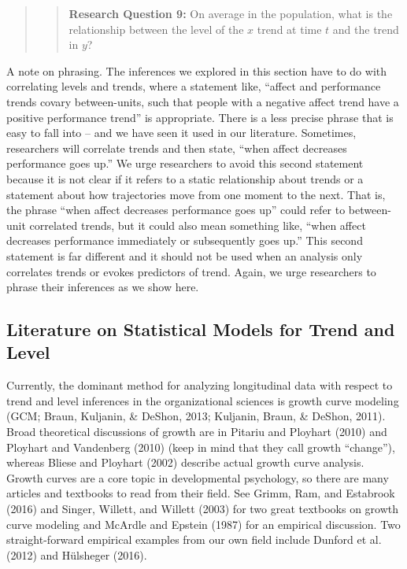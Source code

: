 \documentclass[english,,man]{apa6}
\theoremstyle{definition}
\theoremstyle{definition}
\theoremstyle{definition}
\theoremstyle{remark}
\begin{document}
\begin{quote}
\begin{quote}
\textbf{Research Question 9:} On average in the population, what is the
relationship between the level of the \(x\) trend at time \(t\) and the
trend in \(y\)?
\end{quote}
\end{quote}

A note on phrasing. The inferences we explored in this section have to
do with correlating levels and trends, where a statement like,
\enquote{affect and performance trends covary between-units, such that
people with a negative affect trend have a positive performance trend}
is appropriate. There is a less precise phrase that is easy to fall into
-- and we have seen it used in our literature. Sometimes, researchers
will correlate trends and then state, \enquote{when affect decreases
performance goes up.} We urge researchers to avoid this second statement
because it is not clear if it refers to a static relationship about
trends or a statement about how trajectories move from one moment to the
next. That is, the phrase \enquote{when affect decreases performance
goes up} could refer to between-unit correlated trends, but it could
also mean something like, \enquote{when affect decreases performance
immediately or subsequently goes up.} This second statement is far
different and it should not be used when an analysis only correlates
trends or evokes predictors of trend. Again, we urge researchers to
phrase their inferences as we show here.

\hypertarget{literature-on-statistical-models-for-trend-and-level}{%
\subsection{Literature on Statistical Models for Trend and
Level}\label{literature-on-statistical-models-for-trend-and-level}}

Currently, the dominant method for analyzing longitudinal data with
respect to trend and level inferences in the organizational sciences is
growth curve modeling (GCM; Braun, Kuljanin, \& DeShon, 2013; Kuljanin,
Braun, \& DeShon, 2011). Broad theoretical discussions of growth are in
Pitariu and Ployhart (2010) and Ployhart and Vandenberg (2010) (keep in
mind that they call growth \enquote{change}), whereas Bliese and
Ployhart (2002) describe actual growth curve analysis. Growth curves are
a core topic in developmental psychology, so there are many articles and
textbooks to read from their field. See Grimm, Ram, and Estabrook (2016)
and Singer, Willett, and Willett (2003) for two great textbooks on
growth curve modeling and McArdle and Epstein (1987) for an empirical
discussion. Two straight-forward empirical examples from our own field
include Dunford et al. (2012) and Hülsheger (2016).
\end{document}
